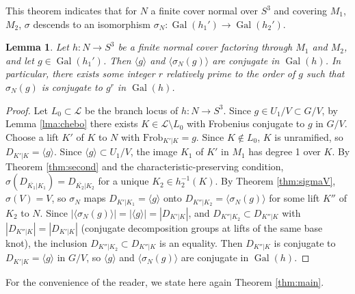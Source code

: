 \documentclass{amsart}
\theoremstyle{plain}
\theoremstyle{definition}
\theoremstyle{plain}
\theoremstyle{plain}
\theoremstyle{plain}
\newtheorem{lemma}[theorem]{Lemma}
\theoremstyle{remark}
\theoremstyle{remark}
\theoremstyle{plain}
\theoremstyle{definition}
\theoremstyle{plain}
\DeclareMathOperator{\Gal}{\mathrm{Gal}}
\newcounter{main}
\theoremstyle{plain}
\theoremstyle{plain}
\numberwithin{equation}{section}
\begin{document}
This theorem indicates that for $N$ a finite cover normal over $S^3$ and covering $M_1$, $M_2$, $\sigma$ descends to an isomorphism $\sigma_N: \Gal(h_1') \to \Gal(h_2')$.

\begin{lemma}\label{lma:uchida2}
Let $h: N \to S^3$ be a finite normal cover factoring through $M_1$ and $M_2$, and let $g \in \Gal(h_1')$. Then $\langle g \rangle$ and $\langle \sigma_N(g) \rangle$ are conjugate in $\Gal(h)$. In particular, there exists some integer $r$ relatively prime to the order of $g$ such that $\sigma_N(g)$ is conjugate to $g^r$ in $\Gal(h)$. 
\end{lemma}

\begin{proof}
Let $L_0 \subset \mathcal{L}$ be the branch locus of $h: N \to S^3$. Since $g \in U_1/V \subset G/V$, by Lemma \ref{lma:chebo} there exists $K \in \mathcal L \setminus L_0$ with Frobenius conjugate to $g$ in $G/V$. Choose a lift $K'$ of $K$ to $N$ with $\text{Frob}_{K'|K} = g$. Since $K \notin L_0$, $K$ is unramified, so $D_{K'|K} = \langle g \rangle$. Since $\langle g \rangle \subset U_1/V$, the image $K_1$ of $K'$ in $M_1$ has degree 1 over $K$. By Theorem \ref{thm:second} and the characteristic-preserving condition, $\sigma(D_{\overline{K_1}|K_1}) = D_{\overline{K_2}|K_2}$ for a unique $K_2 \in h_2^{-1}(K)$. By Theorem \ref{thm:sigmaV}, $\sigma(V) = V$, so $\sigma_N$ maps $D_{K'|K_1} = \langle g \rangle$ onto $D_{K''|K_2} = \langle \sigma_N(g) \rangle$ for some lift $K''$ of $K_2$ to $N$. Since $|\langle \sigma_N(g) \rangle| = |\langle g \rangle| = |D_{K'|K}|$, and $D_{K''|K_2} \subset D_{K''|K}$ with $|D_{K''|K}| = |D_{K'|K}|$ (conjugate decomposition groups at lifts of the same base knot), the inclusion $D_{K''|K_2} \subset D_{K''|K}$ is an equality. Then $D_{K''|K}$ is conjugate to $D_{K'|K} = \langle g \rangle$ in $G/V$, so $\langle g \rangle$ and $\langle \sigma_N(g) \rangle$ are conjugate in $\Gal(h)$.
\end{proof}

For the convenience of the reader, we state here again Theorem \ref{thm:main}. 
\end{document}
